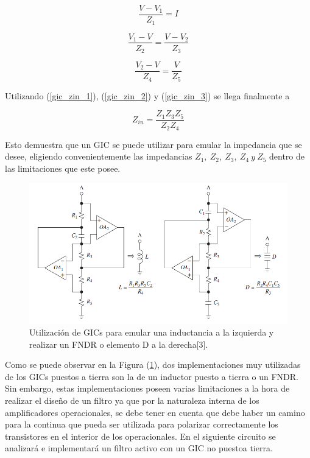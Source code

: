 \documentclass[a4paper]{article}
\begin{document}
\begin{equation}
\frac{V-V_1}{Z_1}=I
\label{gic_zin_1}
\end{equation}

\begin{equation}
\frac{V_1-V}{Z_2} = \frac{V-V_2}{Z_3}
\label{gic_zin_2}
\end{equation}

\begin{equation}
\frac{V_2-V}{Z_4} = \frac{V}{Z_5}
\label{gic_zin_3}
\end{equation}

Utilizando (\ref{gic_zin_1}), (\ref{gic_zin_2}) y (\ref{gic_zin_3}) se llega finalmente a

\begin{equation}
Z_{in} = \frac{Z_1 Z_3 Z_5}{Z_2 Z_4}
\label{grounded_gic_zin}
\end{equation}

Esto demuestra que un GIC se puede utilizar para emular la impedancia que se desee, eligiendo convenientemente las impedancias $Z_1, \ Z_2, \ Z_3, \ Z_4 \ y \ Z_5$ dentro de las limitaciones que este posee.

\begin{figure}[H]
	\centering
	\includegraphics[width=1\textwidth]{Imagenes/gic_ind_fndr.PNG}
	\caption{Utilización de GICs para emular una inductancia a la izquierda y realizar un FNDR o elemento D a la derecha[3].}
	\label{fig:gic_ind_fndr}
\end{figure}

Como se puede observar en la Figura (\ref{fig:gic_ind_fndr}), dos implementaciones muy utilizadas de los GICs puestos a tierra son la de un inductor puesto a tierra o un FNDR. Sin embargo, estas implementaciones poseen varias limitaciones a la hora de realizar el diseño de un filtro ya que por la naturaleza interna de los amplificadores operacionales, se debe tener en cuenta que debe haber un camino para la continua que pueda ser utilizada para polarizar correctamente los transistores en el interior de los operacionales. En el siguiente circuito se analizará e implementará un filtro activo con un GIC no puestoa tierra.
\end{document}
